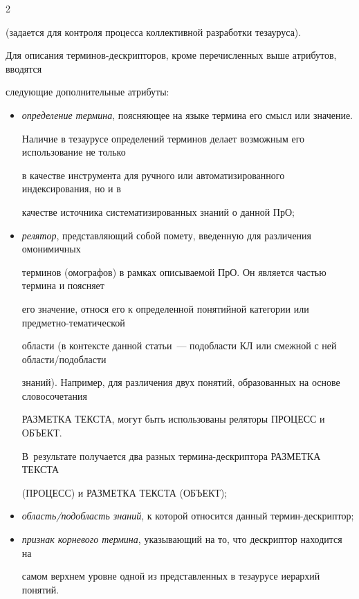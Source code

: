 \begin{multicols}{2}
\begin{itemize}
(задается для контроля процесса коллективной разработки тезауруса).

  \end{itemize}

  

  Для описания терминов-дескрипторов, кроме перечисленных выше атрибутов, вводятся 

сле\-ду\-ющие дополнительные атрибуты:

  \begin{itemize}

\item  \textit{определение термина}, поясняющее на языке термина его смысл или значение. 

Наличие в тезаурусе определений терминов делает возможным его использование не только 

в качестве инструмента для ручного или автоматизированного индексирования, но и в 

качестве источника систематизированных знаний о данной ПрО;

  \item

  \textit{релятор}, представляющий собой помету, введенную для различения омонимичных 

терминов (омографов) в рамках описываемой ПрО. Он является частью термина и поясняет 

его значение, относя его к определенной понятийной категории или предметно-тематической 

области (в контексте данной статьи~--- подобласти КЛ или смежной с ней области/подобласти 

знаний). Например, для различения двух понятий, образованных на основе словосочетания 

РАЗМЕТКА ТЕКСТА, могут быть использованы реляторы ПРОЦЕСС и ОБЪЕКТ. 

В~результате получается два разных термина-дескриптора РАЗМЕТКА ТЕКСТА 

(ПРОЦЕСС) и РАЗМЕТКА ТЕКСТА (ОБЪЕКТ);

  \item

  \textit{область/подобласть знаний}, к которой относится данный термин-дескриптор;

  \item

  \textit{признак корневого термина}, указывающий на то, что дескриптор находится на 

самом верхнем уровне одной из представленных в тезаурусе иерархий понятий.


\end{itemize}
\end{multicols}

